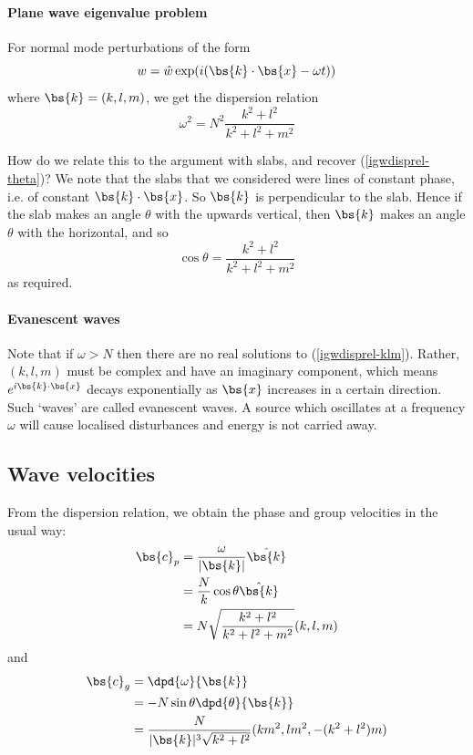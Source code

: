 \paragraph{Plane wave eigenvalue problem}
For normal mode perturbations of the form
\begin{equation}
	w = \hat{w}\exp(i(\bs{k}\cdot\bs{x}-\omega t))
\end{equation}
where $\bs{k} = (k,l,m)$, we get the dispersion relation
\begin{equation}
	\omega^2 = N^2 \frac{k^2+l^2}{k^2+l^2+m^2}
	\label{igwdisprel-klm}
\end{equation}

How do we relate this to the argument with slabs, and recover (\ref{igwdisprel-theta})? We note that the slabs that we considered were lines of constant phase, i.e. of constant $\bs{k}\cdot\bs{x}$. So $\bs{k}$ is perpendicular to the slab. Hence if the slab makes an angle $\theta$ with the upwards vertical, then $\bs{k}$ makes an angle $\theta$ with the horizontal, and so
\begin{equation}
	\cos\theta = \frac{k^2+l^2}{k^2+l^2+m^2}
\end{equation}
as required. 

\paragraph{Evanescent waves}
Note that if $\omega > N$ then there are no real solutions to (\ref{igwdisprel-klm}). Rather, $(k,l,m)$ must be complex and have an imaginary component, which means $e^{i\bs{k}\cdot\bs{x}}$ decays exponentially as $\bs{x}$ increases in a certain direction. Such `waves' are called evanescent waves. A source which oscillates at a frequency $\omega$ will cause localised disturbances and energy is not carried away.

\subsection{Wave velocities}

From the dispersion relation, we obtain the phase and group velocities in the usual way:
\begin{align}
	\bs{c}_p &= \frac{\omega}{|\bs{k}|} \hat{\bs{k}} \\
		&= \frac{N}{k}\cos\theta \hat{\bs{k}} \\
		&= N \sqrt{\frac{k^2+l^2}{k^2+l^2+m^2}} (k,l,m)
\end{align}
and
\begin{align}
	\bs{c}_g &= \dpd{\omega}{\bs{k}} \\
		&= -N \sin\theta \dpd{\theta}{\bs{k}}\\
		&=\frac{N}{|\bs{k}|^3 \sqrt{k^2+l^2}} (km^2,lm^2,-(k^2+l^2)m)
\end{align}

